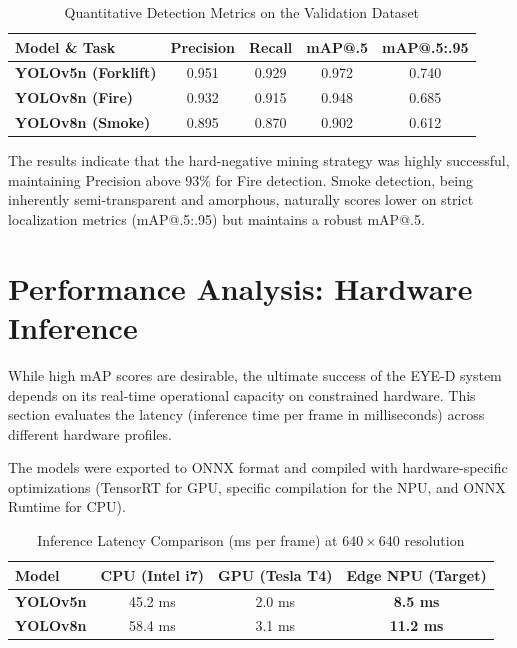 \begin{table}[h]
\centering
\caption{Quantitative Detection Metrics on the Validation Dataset}
\label{tab:eval-metrics}
\renewcommand{\arraystretch}{1.2}
\begin{tabular}{|l|c|c|c|c|}
\hline
\textbf{Model \& Task} & \textbf{Precision} & \textbf{Recall} & \textbf{mAP@.5} & \textbf{mAP@.5:.95} \\
\hline
\textbf{YOLOv5n (Forklift)} & 0.951 & 0.929 & 0.972 & 0.740 \\
\hline
\textbf{YOLOv8n (Fire)} & 0.932 & 0.915 & 0.948 & 0.685 \\
\hline
\textbf{YOLOv8n (Smoke)} & 0.895 & 0.870 & 0.902 & 0.612 \\
\hline
\end{tabular}
\end{table}

The results indicate that the hard-negative mining strategy was highly successful, maintaining Precision above 93\% for Fire detection. Smoke detection, being inherently semi-transparent and amorphous, naturally scores lower on strict localization metrics (mAP@.5:.95) but maintains a robust mAP@.5.

\section{Performance Analysis: Hardware Inference}
While high mAP scores are desirable, the ultimate success of the EYE-D system depends on its real-time operational capacity on constrained hardware. This section evaluates the latency (inference time per frame in milliseconds) across different hardware profiles.

The models were exported to ONNX format and compiled with hardware-specific optimizations (TensorRT for GPU, specific compilation for the NPU, and ONNX Runtime for CPU).

\begin{table}[h]
\centering
\caption{Inference Latency Comparison (ms per frame) at $640 \times 640$ resolution}
\label{tab:hardware-inference}
\renewcommand{\arraystretch}{1.2}
\begin{tabular}{|l|c|c|c|}
\hline
\textbf{Model} & \textbf{CPU (Intel i7)} & \textbf{GPU (Tesla T4)} & \textbf{Edge NPU (Target)} \\
\hline
\textbf{YOLOv5n} & 45.2 ms & 2.0 ms & \textbf{8.5 ms} \\
\hline
\textbf{YOLOv8n} & 58.4 ms & 3.1 ms & \textbf{11.2 ms} \\
\hline
\end{tabular}
\end{table}

